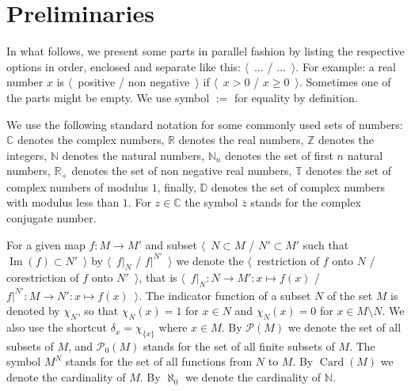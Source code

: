 
\chapter{Preliminaries}\label{ChapterPreliminaries} 


In what follows, we present some parts in parallel fashion by listing the
respective options in order, enclosed and separate like this:
$\langle$~$\ldots$ / $\ldots$~$\rangle$. For example: a real number $x$ is
$\langle$~positive / non negative~$\rangle$ if $\langle$~$x>0$ / $x\geq
0$~$\rangle$. Sometimes one of the parts might be empty. We use symbol $:=$ for
equality by definition.

We use the following standard notation for some commonly used sets of numbers:
$\mathbb{C}$ denotes the complex numbers, $\mathbb{R}$ denotes the real numbers,
$\mathbb{Z}$ denotes the integers, $\mathbb{N}$ denotes the natural numbers,
$\mathbb{N}_n$ denotes the set of first $n$ natural numbers, $\mathbb{R}_+$
denotes the set of non negative real numbers, $\mathbb{T}$ denotes the set of
complex numbers of modulus $1$, finally, $\mathbb{D}$ denotes the set of complex
numbers with modulus less than $1$. For $z\in\mathbb{C}$ the symbol
$\overline{z}$ stands for the complex conjugate number.

For a given map $f:M\to M'$ and subset $\langle$~$N\subset M$ / $N'\subset M'$
such that $\operatorname{Im}(f)\subset N'$~$\rangle$ by $\langle$~$f|_N$ /
$f|^{N'}$~$\rangle$ we denote the  $\langle$~restriction of $f$ onto $N$ /
corestriction of $f$ onto $N'$~$\rangle$, that is $\langle$~$f|_N:N\to
M':x\mapsto f(x)$ / $f|^{N'}:M\to N':x\mapsto f(x)$~$\rangle$. The indicator
function of a subset $N$ of the set $M$ is denoted by $\chi_{N}$, so that
$\chi_N(x)=1$ for $x\in N$ and $\chi_N(x)=0$ for $x\in M\setminus N$. We also
use the shortcut $\delta_x=\chi_{ \{x \}}$ where $x\in M$. By $\mathcal{P}(M)$
we denote the set of all subsets of $M$, and $\mathcal{P}_0(M)$ stands for the
set of all finite subsets of $M$. The symbol $M^N$ stands for the set of all
functions from $N$ to $M$. By $\operatorname{Card}(M)$ we denote the cardinality
of $M$. By $\aleph_0$ we denote the cardinality of $\mathbb{N}$.

